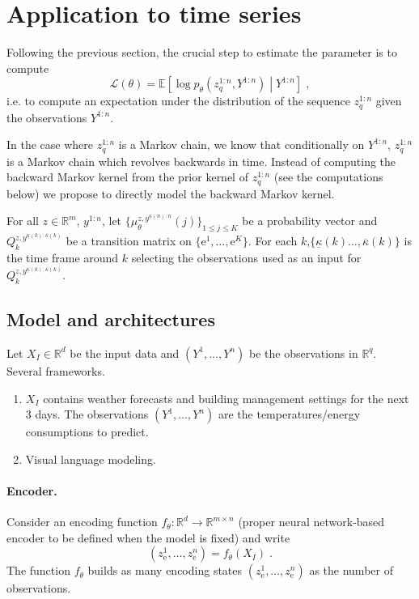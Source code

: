 \documentclass{article}
\newcommand{\rset}{\ensuremath{\mathbb{R}}}
\newcommand{\eqsp}{\;}
\newcommand{\rme}{\mathrm{e}}
\begin{document}
\section{Application to time series}
\label{sec:model}
Following the previous section, the crucial step to estimate the parameter is to compute
$$
\mathcal{L}(\theta) = \mathbb{E}\left[\log p_{\theta}(z^{1:n}_q,Y^{1:n})  \middle | Y^{1:n}\right]\eqsp,
$$
i.e. to compute an expectation under the distribution of the sequence $z^{1:n}_q$ given the observations $Y^{1:n}$.

In the case where $z^{1:n}_q$ is a Markov chain, we know that conditionally on $Y^{1:n}$, $z^{1:n}_q$ is a Markov chain which revolves backwards in time. Instead of computing the backward Markov kernel from the prior kernel of $z^{1:n}_q$ (see the computations below) we propose to directly model the backward Markov kernel.

For all $z\in\rset^m$, $y^{1:n}$, let $\{\mu^{z,y^{\underline\kappa(n):n}}_{\theta}(j)\}_{1\leqslant j\leqslant K}$ be a probability vector and $Q_k^{z,y^{\underline\kappa(k):\overline\kappa(k)}}$ be a transition matrix on $\{\rme^1,\ldots, \rme^K\}$. For each $k$,$\{\underline\kappa(k)\ldots,\overline\kappa(k)\}$ is the time frame around $k$ selecting the observations used as an input for  $Q_k^{z,y^{\underline\kappa(k):\overline\kappa(k)}}$.

\subsection{Model and architectures}
Let $X_I \in \rset^d$ be the input data and $(Y^1,\ldots,Y^n)$ be the observations in $\rset^q$.  Several frameworks.
\begin{enumerate}
\item $X_I$ contains weather forecasts and building management settings for the next 3 days. The observations $(Y^1,\ldots,Y^n)$  are the temperatures/energy consumptions to predict.
\item Visual language modeling.
\end{enumerate}

\paragraph{Encoder.} Consider an encoding function $f_\theta: \rset^d \to \rset^{m\times n}$ (proper neural network-based encoder  to be defined when the model is fixed) and write
$$
(z_\rme^1,\ldots, z_\rme^n) = f_\theta(X_I)\eqsp.
$$
The function $f_\theta$ builds as many encoding states $(z_\rme^1,\ldots, z_\rme^n)$ as the number of observations.
\end{document}

